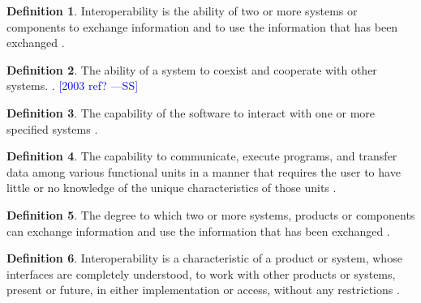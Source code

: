 \documentclass[letterpaper, cleveref]{lipics-v2019}
\newcommand{\authornote}[3]{\textcolor{#1}{[#3 ---#2]}}
\newcommand{\authornote}[3]{}
\newcommand{\wss}[1]{\authornote{blue}{SS}{#1}} %
\theoremstyle{definition}
\newtheorem{defn}{Definition}
\begin{document}
\begin{defn}
  Interoperability is the ability of two or more systems or components to
  exchange information and to use the information that has been exchanged
  \citep{IEEEComputerDictionary1991}.
\end{defn}

\begin{defn}
  The ability of a system to coexist and cooperate with other systems.
  \citep{ghezzi1991fundamentals}.  \wss{2003 ref?}
\end{defn}

\begin{defn}
  The capability of the software to interact with one or more specified
  systems \cite{ISO9126}. %
\end{defn}

\begin{defn}
  The capability to communicate, execute programs, and transfer data among
  various functional units in a manner that requires the user to have little
  or no knowledge of the unique characteristics of those units
  \citep{ISO/IEC/IEEE24765}. %
\end{defn}

\begin{defn}
  \label{InteroperabilitySelected} The degree to which two or more systems,
  products or components can exchange information and use the information
  that has been exchanged \citep{ISO/IEC25010}. %
\end{defn}

\begin{defn}
  Interoperability is a characteristic of a product or system, whose
  interfaces are completely understood, to work with other products or
  systems, present or future, in either implementation or access, without
  any restrictions \citep{AFUL2019}.
\end{defn}
\end{document}

